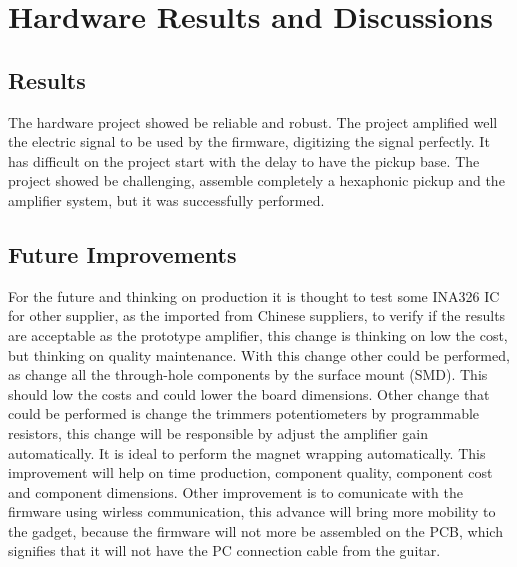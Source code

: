 \section{Hardware Results and Discussions}

\subsection{Results}
The hardware project showed be reliable and robust. The project amplified
well the electric signal to be used by the firmware, digitizing the signal
perfectly. It has difficult on the project start with the delay to have
the pickup base. The project showed be challenging, assemble completely a
hexaphonic pickup and the amplifier system, but it was successfully performed.

\subsection{Future Improvements}
For the future and thinking on production it is thought to test some INA326 IC
for other supplier, as the imported from Chinese suppliers, to verify if the results
are acceptable as the prototype amplifier, this change is thinking on low the cost,
but thinking on quality maintenance.
With this change other could be performed, as change all the through-hole components
by the surface mount (SMD). This should low the costs and could lower the board dimensions.
Other change that could be performed is change the trimmers potentiometers by programmable
resistors, this change will be responsible by adjust the amplifier gain automatically.
It is ideal to perform the magnet wrapping automatically. This improvement will help on time
production, component quality, component cost and component dimensions.
Other improvement is to comunicate with the firmware using wirless communication,
this advance will bring more mobility to the gadget, because the firmware will not more be
assembled on the PCB, which signifies that it will not have the PC connection cable from the guitar.

